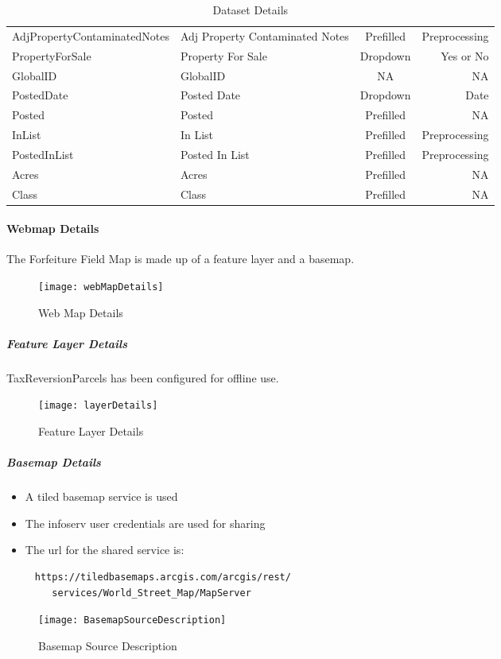 \begin{table}[htbp]
{\begin{tabular}{|l|l|c|r|}
 {\tiny AdjPropertyContaminatedNotes}&{\tiny Adj Property Contaminated Notes}&Prefilled&{\tiny Preprocessing}\\
 PropertyForSale&Property For Sale&Dropdown&{\tiny Yes or No}\\
 GlobalID&GlobalID&NA&NA\\
 PostedDate&Posted Date&Dropdown&Date\\
 Posted&Posted&Prefilled&NA\\
 InList&In List&Prefilled&{\tiny Preprocessing}\\
 PostedInList&Posted In List&Prefilled&{\tiny Preprocessing}\\
 Acres&Acres&Prefilled&NA\\
 Class&Class&Prefilled&NA\\
 \hline
 \end{tabular}
 }
 \caption{Dataset Details}
 \end{table}
 \clearpage
 \paragraph{Webmap Details}The Forfeiture Field Map is made up of a feature layer and a basemap.
 \begin{figure}[h!]
 \centering
     \texttt{[image: webMapDetails]}
 \vspace{-.2in}

 \caption{Web Map Details}
 \end{figure}
 \subparagraph{Feature Layer Details}TaxReversionParcels has been configured for offline use.
 \begin{figure}[h!]
 \centering
     \texttt{[image: layerDetails]}
 \vspace{-.15in}

 \caption{Feature Layer Details}
 \end{figure}
 \clearpage
 \subparagraph{Basemap Details}
 \begin{itemize}
   \setlength\itemsep{.3in}
   \item A tiled basemap service is used
   \item The infoserv user credentials are used for sharing
   \item The url for the shared service is:
 \end{itemize}
 \begin{verbatim}
     https://tiledbasemaps.arcgis.com/arcgis/rest/
        services/World_Street_Map/MapServer
 \end{verbatim}
 \begin{figure}[h!]
 \centering
 \texttt{[image: BasemapSourceDescription]}
 \caption{Basemap Source Description}
 \end{figure}
 \clearpage
